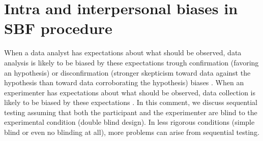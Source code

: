 \documentclass[a4paper,man,natbib,floatsintext,donotrepeattitle]{apa6}
\begin{document}

\section{Intra and interpersonal biases in SBF procedure}

When a data analyst has expectations about what should be observed, data analysis is likely to be biased by these expectations trough confirmation (favoring an hypothesis) or disconfirmation (stronger skepticism toward data against the hypothesis than toward data corroborating the hypothesis) biases \citep{lilienfeld_blind_2017}. When an experimenter has expectations about what should be observed, data collection is likely to be biased by these expectations \citep{orne_social_1962,rosenthal_social_1963,rosenthal_experimenter_1964,tuyttens_opinion_2016,zoble_interaction_1969}.
In this comment, we discuss sequential testing assuming that both the participant and the experimenter are blind to the experimental condition (double blind design). In less rigorous conditions (simple blind or even no blinding at all), more problems can arise from sequential testing. \par
\end{document}
